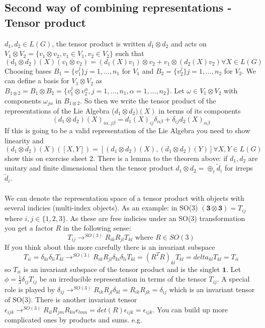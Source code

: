 \documentclass{article}
\begin{document}
{\subsection{Second way of combining representations - Tensor product}
$d_1, d_2 \in L(G)$, the tensor product is written $d_1 \otimes d_2$ and acts on $V_1 \otimes V_2 = \{v_1 \otimes v_2,v_1 \in V_1, v_2 \in V_2\}$ such that 
$$
(d_1 \otimes d_2)(X)(v_1 \otimes v_2) = (d_1(X)v_1) \otimes v_2 + v_1 \otimes (d_2(X) v_2) \forall X \in L(G)
$$
Choosing bases $B_1 = \{v_1^j \} j = 1,...,n_1$ for $V_1$ and $B_2 = \{v_2^j \} j = 1,...,n_2$ for $V_2$. We can define a basis for $V_1 \otimes V_2$ as $B_{1\otimes 2} = B_1 \otimes B_2 = \{v_1^j \otimes v_2^{\alpha}, j = 1,...,n_1, \alpha = 1,..., n_2\}$. Let $\omega \in V_1 \otimes V_2$ with components $\omega_{j\alpha}$ in $B_{1\otimes 2}$. So then we write the tensor product of the representations of the Lie Algebra ($d_1 \otimes d_2)(X)$ in terms of its components $$(d_1 \otimes d_2)(X)_{i\alpha, j \beta} = d_1(X)_{ij} \delta_{\alpha \beta} + \delta_{ij} d_2(X)_{\alpha \beta}$$
If this is going to be a valid representation of the Lie Algebra you need to show linearity and 
$$
(d_1 \otimes d_2)(X)([X,Y]) = [(d_1\otimes d_2)(X), (d_1 \otimes d_2)(Y)] \forall X,Y \in L(G)
$$
show this on exercise sheet 2. There is a lemma to the theorem above: if $d_1, d_2$ are unitary and finite dimensional then the tensor product $d_1 \otimes d_2 = \oplus_{i}\tilde d_i$ for irreps $\tilde d_i$.\\\\
We can denote the representation space of a tensor product with objects with several indicies (multi-index objects). As an example: in SO(3) $(\bm 3 \otimes \bm 3) = T_{ij} $ where $i,j \in \{1,2,3\}$. As these are free indicies under an SO(3) transformation you get a factor $R$ in the following sense:
$$
T_{ij} \rightarrow^{SO(3)} R_{ik}R_{jl}T_{kl} \text{ where } R\in SO(3)
$$
If you think about this more carefully there is an invariant subspace
$$
T_{ii} = \delta_{k i} \delta_{l i} T_{kl} \rightarrow^{SO(3)} R_{ik}R_{jl}\delta_{k i} \delta_{l i} T_{kl}  = (R^T R)_{kl} T_{kl} = delta_{kl} T_{kl} = T_{ii}
$$
so $T_{ii}$ is an invariant subspace of the tensor product and is the singlet $\bm 1$. Let $\phi = \frac{1}{3} \delta_{ij}T_{ij}$ be an irreducible representation in terms of the tensor $T_{ij}$. A special role is played by $\delta_{ij} \rightarrow^{SO(3)} R_{ik}R_{jl} \delta_{kl} = R_{ik}R_{jk} = \delta_{ij}$ which is an invariant tensor of SO(3). There is another invariant tensor $\epsilon_{ijk} \rightarrow^{SO(3)} R_{il}R_{jm}R_{kn} \epsilon_{lmn} = det(R) \epsilon_{ijk} = \epsilon_{ijk}$. You can build up more complicated ones by products and sums. e.g.
}
\end{document}
